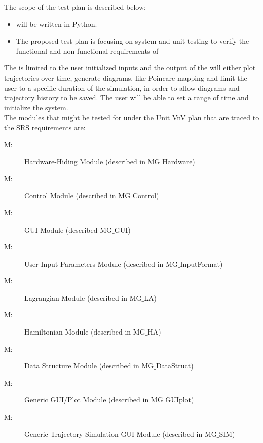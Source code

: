 \documentclass[12pt, titlepage]{article}
\newcounter{mnum}
\newcommand{\mthemnum}{M\themnum}
\begin{document}
The scope of the test plan is described below:
\begin{itemize}
\item \progname{} will be written in Python.
\item The proposed test plan is focusing on system and unit testing to
  verify the functional and non functional requirements of
  \progname{}
\end{itemize}

The \progname is limited to the user
initialized inputs and the output of the \progname will either plot trajectories over time, generate
diagrams, like Poincare mapping
and limit the user to a specific duration of the simulation, in order to allow
diagrams and trajectory history to be saved.
The user will be able to set a range of time and initialize the system. \\

The modules that might be tested for under the Unit VnV plan that are traced to the SRS requirements are:
\begin{description}
\item [ \mthemnum \label{mHH}:] Hardware-Hiding Module (described in MG$\_$Hardware)
\item [ \mthemnum \label{mHH}:] \progname Control Module (described in MG$\_$Control)
\item [ \mthemnum \label{mHH}:] \progname GUI Module (described MG$\_$GUI)
\item [ \mthemnum \label{mHH}:] User Input Parameters Module (described in MG$\_$InputFormat)
\item [ \mthemnum \label{mHH}:] Lagrangian Module (described in MG$\_$LA)
\item [ \mthemnum \label{mHH}:] Hamiltonian Module (described in MG$\_$HA)
\item [ \mthemnum \label{mHH}:] Data Structure Module (described in MG$\_$DataStruct)
\item [ \mthemnum \label{mHH}:] Generic GUI/Plot Module (described in MG$\_$GUIplot)
\item [ \mthemnum \label{mHH}:] Generic Trajectory Simulation GUI Module (described in MG$\_$SIM)
\end{description}

\end{document}

